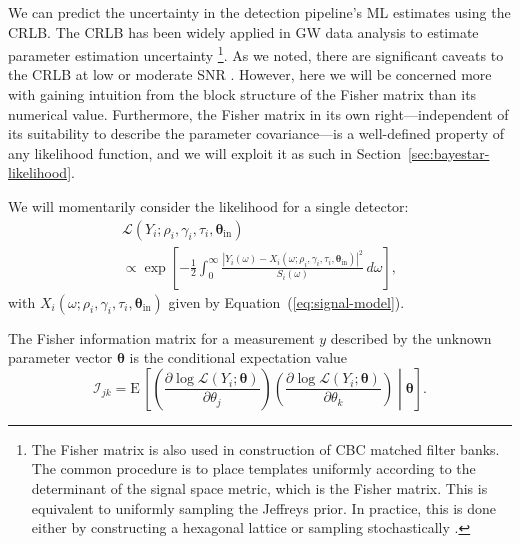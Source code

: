 \documentclass[amsmath,amssymb,aps,prx,reprint,nopreprintnumbers,nofootinbib]{revtex4-1}
\begin{document}
We can predict the uncertainty in the detection pipeline's \ac{ML} estimates using the \ac{CRLB}. The \ac{CRLB} has been widely applied in \ac{GW} data analysis to estimate parameter estimation uncertainty \cite{1996PhRvD..53.3033B,FairhurstTriangulation,2009PhRvD..79h4032A,WenLocalizationAdvancedLIGO,LIGOObservingScenarios,FairhurstLIGOIndia}\footnote{\label{footnote:template-banks}The Fisher matrix is also used in construction of \ac{CBC} matched filter banks. The common procedure is to place templates uniformly according to the determinant of the signal space metric, which is the Fisher matrix. This is equivalent to uniformly sampling the Jeffreys prior. In practice, this is done either by constructing a hexagonal lattice \citep{PhysRevD.76.102004} or sampling stochastically \citep{2009PhRvD..80j4014H,2009PhRvD..80b4009V,SBank,2010PhRvD..81b4004M,2014PhRvD..89b4003P}.}. As we noted, there are significant caveats to the \ac{CRLB} at low or moderate \ac{SNR} \cite{BayesianBounds,UseAbuseFisherMatrix,FisherMatrixAsymptoticExpansions,InadequaciesFisherMatrix}. However, here we will be concerned more with gaining intuition from the block structure of the Fisher matrix than its numerical value. Furthermore, the Fisher matrix in its own right---independent of its suitability to describe the parameter covariance---is a well\nobreakdashes-defined property of any likelihood function, and we will exploit it as such in Section~\ref{sec:bayestar-likelihood}.

We will momentarily consider the likelihood for a single detector:
%
\begin{multline}\label{eq:gaussian-likelihood-spa}
    \mathcal{L}\left(Y_i; \rho_i, \gamma_i, \tau_i,
        \bm\theta_\mathrm{in}\right)
    \\
    \propto \exp \left[
        - \frac{1}{2} \int_0^\infty \frac{\left|Y_i (\omega)
            - X_i\left(\omega; \rho_i, \gamma_i, \tau_i,
                \bm\theta_\mathrm{in}\right)
        \right|^2}{S_i(\omega)} \, d\omega
    \right],
\end{multline}
%
with $X_i(\omega; \rho_i, \gamma_i, \tau_i, \bm\theta_\mathrm{in})$ given by Equation~(\ref{eq:signal-model}).

The Fisher information matrix for a measurement $y$ described by the unknown parameter vector $\bm{\theta}$ is the conditional expectation value
%
\begin{equation}\label{eq:general-fisher-matrix}
    \mathcal{I}_{jk} = \mathrm{E} \, \left[
        \left(\frac{\partial \log
            \mathcal{L}(Y_i ; \bm\theta)}
            {\partial \theta_j}\right)
        \left(\frac{\partial \log
            \mathcal{L}(Y_i ; \bm\theta)}
            {\partial \theta_k}\right)
    \middle| \bm\theta
    \right].
\end{equation}
\end{document}
